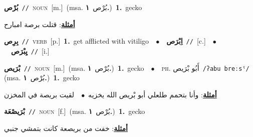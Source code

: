 \documentclass[10pt,a4paper,twoside]{article} %
\begin{document}
\begin{multicols}{2}
{\setlength\topsep{0pt}\textbf{\foreignlanguage{arabic}{بُرْص}}\ {\color{gray}\texttt{//}\color{black}}\ \textsc{noun}\ [m.]\ \color{gray}(msa. \foreignlanguage{arabic}{بُرْص}~\foreignlanguage{arabic}{\textbf{١.}})\color{black}\ \textbf{1.}~gecko\  \begin{flushright}\color{gray}\foreignlanguage{arabic}{\textbf{\underline{\foreignlanguage{arabic}{أمثلة}}}: قتلت برصة امبارح}\end{flushright}\color{black}} \vspace{2mm}

{\setlength\topsep{0pt}\textbf{\foreignlanguage{arabic}{بِرِص}}\ {\color{gray}\texttt{//}\color{black}}\ \textsc{verb}\ [p.]\ \textbf{1.}~get afflicted with vitiligo\ \ $\bullet$\ \ \setlength\topsep{0pt}\textbf{\foreignlanguage{arabic}{اِبْرَص}}\ {\color{gray}\texttt{//}\color{black}}\ [c.]\ \ $\bullet$\ \ \setlength\topsep{0pt}\textbf{\foreignlanguage{arabic}{يِبْرَص}}\ {\color{gray}\texttt{//}\color{black}}\ [i.]\ } \vspace{2mm}

{\setlength\topsep{0pt}\textbf{\foreignlanguage{arabic}{بْرَيص}}\ {\color{gray}\texttt{//}\color{black}}\ \textsc{noun}\ [m.]\ \color{gray}(msa. \foreignlanguage{arabic}{بُرْص}~\foreignlanguage{arabic}{\textbf{١.}})\color{black}\ \textbf{1.}~gecko\ \ $\bullet$\ \ \textsc{ph.} \color{gray} \foreignlanguage{arabic}{أَبُو بْرَيص}\color{black}\ {\color{gray}\texttt{/{\sffamily ʔabu breːsˤ}/}\color{black}}\ \color{gray} (msa. \foreignlanguage{arabic}{بُرْص}~\foreignlanguage{arabic}{\textbf{١.}})\color{black}\ \textbf{1.}~gecko\  \begin{flushright}\color{gray}\foreignlanguage{arabic}{\textbf{\underline{\foreignlanguage{arabic}{أمثلة}}}: وأنا بتحمم طلعلي أبو بْريص الله يخزيه\ $\bullet$\ \  لقيت بريصة في المخزن}\end{flushright}\color{black}} \vspace{2mm}

{\setlength\topsep{0pt}\textbf{\foreignlanguage{arabic}{بْرَيصْعَة}}\ {\color{gray}\texttt{//}\color{black}}\ \textsc{noun}\ [f.]\ \color{gray}(msa. \foreignlanguage{arabic}{بُرْص}~\foreignlanguage{arabic}{\textbf{١.}})\color{black}\ \textbf{1.}~gecko\  \begin{flushright}\color{gray}\foreignlanguage{arabic}{\textbf{\underline{\foreignlanguage{arabic}{أمثلة}}}: خفت من بريصعة كانت بتمشي جنبي}\end{flushright}\color{black}} \vspace{2mm}


\end{multicols}
\end{document}
